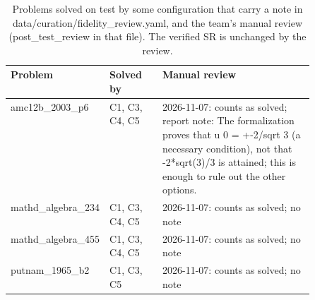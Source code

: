 \begin{table}[t]
\centering
\footnotesize
\setlength{\tabcolsep}{3pt}
\caption{Problems solved on test by some configuration that carry a note in data/curation/fidelity\_review.yaml, and the team's manual review (post\_test\_review in that file). The verified SR is unchanged by the review.}
\label{tab:fidelity}
\begin{tabular}{llp{0.5\linewidth}}
\toprule
Problem & Solved by & Manual review \\
\midrule
amc12b\_2003\_p6 & C1, C3, C4, C5 & 2026-11-07: counts as solved; report note: The formalization proves that u 0 = +-2/sqrt 3 (a necessary condition), not that -2*sqrt(3)/3 is attained; this is enough to rule out the other options. \\
mathd\_algebra\_234 & C1, C3, C4, C5 & 2026-11-07: counts as solved; no note \\
mathd\_algebra\_455 & C1, C3, C4, C5 & 2026-11-07: counts as solved; no note \\
putnam\_1965\_b2 & C1, C3, C5 & 2026-11-07: counts as solved; no note \\
\bottomrule
\end{tabular}
\end{table}

